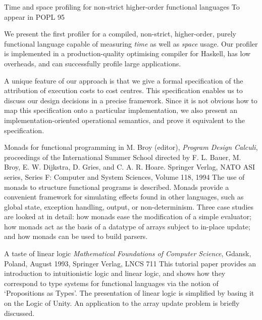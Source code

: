{Time and space profiling for non-strict higher-order functional languages}
{To appear in POPL 95}
{
We present the first profiler for a compiled, non-strict, higher-order,
purely functional language capable of measuring {\em time}
as well as {\em space} usage.  Our profiler is implemented
in a production-quality optimising compiler for Haskell, 
has low overheads, and can successfully profile large applications.

A unique feature of our approach is that we give a formal
specification of the attribution of execution costs to cost centres.
This specification enables us to discuss our design decisions in a
precise framework.  Since it is not obvious how to map this
specification onto a particular implementation, we also present an
implementation-oriented operational semantics, and prove it equivalent
to the specification.
}



{Monads for functional programming}
{in M. Broy (editor),
{\em Program Design Calculi}, proceedings of the International
Summer School directed by F. L. Bauer, M. Broy, E. W. Dijkstra, D.
Gries, and C. A. R. Hoare.  Springer Verlag, NATO ASI series, Series
F: Computer and System Sciences, Volume 118, 1994}
{
The use of monads to structure functional programs is
described.  Monads provide a convenient framework for simulating
effects found in other languages, such as global state, exception
handling, output, or non-determinism.  Three case studies are looked at
in detail: how monads ease the modification of a simple evaluator;
how monads act as the basis of a datatype of arrays subject to in-place
update; and how monads can be used to build parsers.
}

{A taste of linear logic}
{{\em Mathematical Foundations of Computer Science},
Gdansk, Poland, August 1993, Springer Verlag, LNCS 711}
{This tutorial paper provides an introduction to intuitionistic logic
and linear logic, and shows how they correspond to type systems for
functional languages via the notion of `Propositions as Types'.  The
presentation of linear logic is simplified by basing it on the Logic
of Unity.  An application to the array update problem is briefly
discussed.
}


